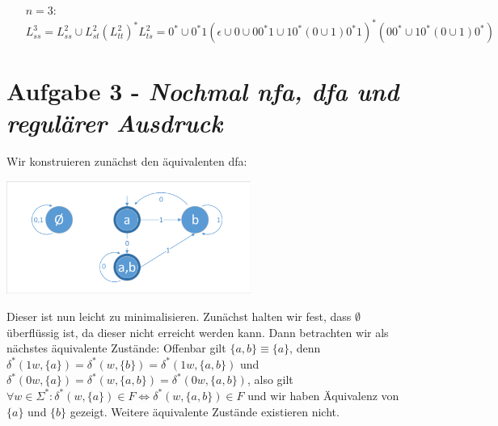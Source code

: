 \documentclass{article}
\begin{document}
\begin{enumerate}
	\item[$n=3:$]
	\begin{equation}
		L_{ss}^3 = L_{ss}^2 \cup L_{st}^2 (L_{tt}^2)^* L_{ts}^2 = 0^* \cup 0^*1 (\epsilon \cup 0  \cup 00^*1 \cup 10^*(0\cup 1)0^*1 )^* (00^* \cup 10^*(0\cup 1)0^*)
	\end{equation}
	
	
\end{enumerate}


\section*{Aufgabe 3 - \textit{Nochmal nfa, dfa und regulärer Ausdruck}}

Wir konstruieren zunächst den äquivalenten dfa:

\begin{minipage}{\textwidth}
	\centering \includegraphics[width=0.6\textwidth,page=1,trim={2 2 2 4},clip]{dfas.pdf}
\end{minipage}

Dieser ist nun leicht zu minimalisieren. Zunächst halten wir fest, dass $\emptyset$ überflüssig ist, da dieser nicht erreicht werden kann. Dann betrachten wir als nächstes äquivalente Zustände: Offenbar gilt $\{a,b\} \equiv \{a\}$, denn $\delta^*(1w,\{a\}) = \delta^*(w,\{b\}) = \delta^*(1w, \{a,b\})$ und $\delta^*(0w,\{a\}) = \delta^*(w,\{a,b\}) = \delta^*(0w,\{a,b\})$, also gilt $\forall w \in \Sigma^* : \delta^*(w, \{a\}) \in F \Leftrightarrow \delta^*(w, \{a,b\}) \in F$ und wir haben Äquivalenz von $\{a\}$ und $\{b\}$ gezeigt. Weitere äquivalente Zustände existieren nicht.
\end{document}
